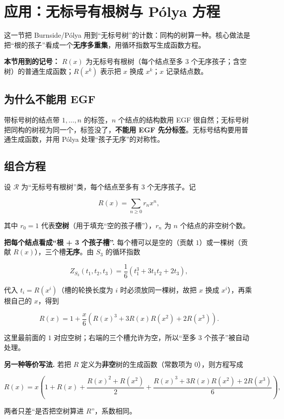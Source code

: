 \section{应用：无标号有根树与 Pólya 方程}


这一节把 Burnside/Pólya 用到“无标号树”的计数：同构的树算一种。核心做法是把“根的孩子”看成一个\textbf{无序多重集}，用循环指数写生成函数方程。

\textbf{本节用到的记号：} $R(x)$ 为无标号有根树（每个结点至多 $3$ 个无序孩子；含空树）的普通生成函数；$R(x^k)$ 表示把 $x$ 换成 $x^k$；$x$ 记录结点数。

\subsection{为什么不能用 EGF}


带标号树的结点带 $1,\dots,n$ 的标签，$n$ 个结点的结构数用 EGF 很自然；无标号树把同构的树视为同一个，标签没了，\textbf{不能用 EGF 先分标签}。无标号结构要用普通生成函数，并用 Pólya 处理“孩子无序”的对称性。

\subsection{组合方程}


设 $\mathcal R$ 为“无标号有根树”类，每个结点至多有 $3$ 个无序孩子。记

\[
R(x)=\sum_{n\ge0}r_nx^n,
\]

其中 $r_0=1$ 代表\textbf{空树}（用于填充“空的孩子槽”），$r_n$ 为 $n$ 个结点的非空树个数。

\textbf{把每个结点看成“根 + 3 个孩子槽”.} 每个槽可以是空的（贡献 $1$）或一棵树（贡献 $R(x)$），三个槽\textbf{无序}。由 $S_3$ 的循环指数

\[
Z_{S_3}(t_1,t_2,t_3)=\frac16\left(t_1^3+3t_1t_2+2t_3\right),
\]

代入 $t_i=R(x^i)$（槽的轮换长度为 $i$ 时必须放同一棵树，故把 $x$ 换成 $x^i$），再乘根自己的 $x$，得到

\[
R(x)=1+\frac{x}{6}\left(R(x)^3+3R(x)R(x^2)+2R(x^3)\right).
\]

这里最前面的 $1$ 对应空树；右端的三个槽允许为空，所以“至多 $3$ 个孩子”被自动处理。

\textbf{另一种等价写法.} 若把 $R$ 定义为\textbf{非空}树的生成函数（常数项为 $0$），则方程写成

\[
R(x)=x\left(1+R(x)+\frac{R(x)^2+R(x^2)}{2}
+\frac{R(x)^3+3R(x)R(x^2)+2R(x^3)}{6}\right),
\]

两者只差“是否把空树算进 $R$”，系数相同。

